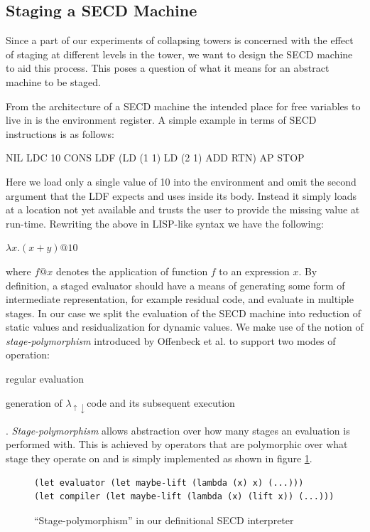 \documentclass{article}
\theoremstyle{definition}
\newcommand{\mslang}{$\lambda_{\uparrow\downarrow}$}
\begin{document}
\subsection{Staging a SECD Machine}\label{sec:secd_staged}
Since a part of our experiments of collapsing towers is concerned with the effect of staging at different levels in the tower, we want to design the SECD machine to aid this process. This poses a question of what it means for an abstract machine to be staged.

From the architecture of a SECD machine the intended place for free variables to live in is the environment register. A simple example in terms of SECD instructions is as follows:

NIL LDC 10 CONS LDF (LD (1 1) LD (2 1) ADD RTN) AP STOP

Here we load only a single value of 10 into the environment and omit the second argument that the LDF expects and uses inside its body. Instead it simply loads at a location not yet available and trusts the user to provide the missing value at run-time. Rewriting the above in LISP-like syntax we have the following:

$\lambda x.(x + y)@10$

where $f@x$ denotes the application of function $f$ to an expression $x$. By definition, a staged evaluator should have a means of generating some form of intermediate representation, for example residual code, and evaluate in multiple stages. In our case we split the evaluation of the SECD machine into reduction of static values and residualization for dynamic values. We make use of the notion of \textit{stage-polymorphism} introduced by Offenbeck et al. \cite{ofenbeck2017staging} to support two modes of operation:
\begin{enumerate*}[label=(\arabic*)]
	\item regular evaluation
	\item generation of \mslang code and its subsequent execution
\end{enumerate*}.
\textit{Stage-polymorphism} allows abstraction over how many stages an evaluation is performed with. This is achieved by operators that are polymorphic over what stage they operate on and is simply implemented as shown in figure \ref{lst:stage_poly_ex}.

\begin{figure}[ht]
\centering
\begin{verbatim}
(let evaluator (let maybe-lift (lambda (x) x) (...)))
(let compiler (let maybe-lift (lambda (x) (lift x)) (...)))
\end{verbatim}
\caption{``Stage-polymorphism'' \cite{amin2017collapsing} in our definitional SECD interpreter}
\label{lst:stage_poly_ex}
\end{figure}
\end{document}
